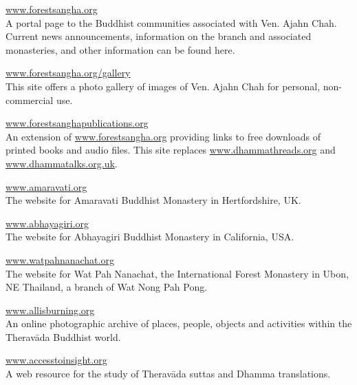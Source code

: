 

\vspace*{-\baselineskip}
\begingroup\setlength{\parindent}{0pt}\setlength{\parskip}{1.2em}

\href{http://forestsangha.org/}{\large www.forestsangha.org}\\
A portal page to the Buddhist communities associated with Ven. Ajahn Chah. Current news announcements, information on the branch and associated monasteries, and other information can be found here.

\href{http://forestsangha.org/gallery/}{\large www.forestsangha.org/gallery}\\
This site offers a photo gallery of images of Ven. Ajahn Chah for personal, non-commercial use.

\href{http://forestsanghapublications.org/}{\large www.forestsanghapublications.org}\\
An extension of \href{http://forestsangha.org/}{www.forestsangha.org} providing links to free downloads of printed books and audio files. This site replaces \href{http://www.dhammathreads.org/}{www.dhammathreads.org} and \href{http://www.dhammatalks.org.uk/}{www.dhammatalks.org.uk}.

\href{http://amaravati.org/}{\large www.amaravati.org}\\
The website for Amaravati Buddhist Monastery in Hertfordshire, UK.

\href{http://www.abhayagiri.org/}{\large www.abhayagiri.org}\\
The website for Abhayagiri Buddhist Monastery in California, USA.

\href{http://watpahnanachat.org/}{\large www.watpahnanachat.org}\\
The website for Wat Pah Nanachat, the International Forest Monastery in Ubon, NE Thailand, a branch of Wat Nong Pah Pong.

\href{http://allisburning.org/}{\large www.allisburning.org}\\
An online photographic archive of places, people, objects and activities within the Therav\=ada Buddhist world.

\href{http://www.accesstoinsight.org/}{\large www.accesstoinsight.org}\\
A web resource for the study of Therav\=ada suttas and Dhamma translations.

\endgroup

